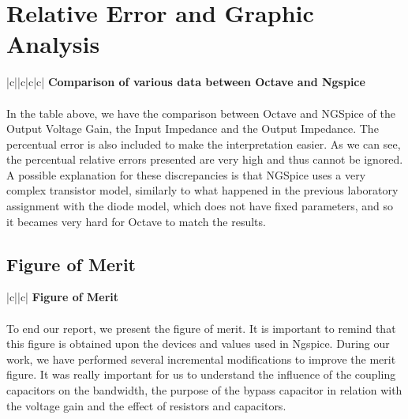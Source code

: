 \section{Relative Error and Graphic Analysis}
\label{sec:erroranalysis}

\begin{center}
   \begin{tabular}{|c||c|c|c|}
      \hline    
       {\bf Comparison of various data between Octave and Ngspice} \\
      \hline
        
   \end{tabular}
\end{center}

\paragraph{}
In the table above, we have the comparison between Octave and NGSpice of the Output Voltage Gain, the Input Impedance and the Output Impedance. The percentual error is also included to make the interpretation easier. As we can see, the percentual relative errors presented are very high and thus cannot be ignored. A possible explanation for these discrepancies is that NGSpice uses a very complex transistor model, similarly to what happened in the previous laboratory assignment with the diode model, which does not have fixed parameters, and so it becames very hard for Octave to match the results.

\subsection{Figure of Merit}
\label{subsec:Figure_of_Merit}

\begin{center}
   \begin{tabular}{|c||c|}
      \hline    
       {\bf Figure of Merit} \\
      \hline
        
   \end{tabular}
 \end{center}

\paragraph{}
To end our report, we present the figure of merit. It is important to remind that this figure is obtained upon the devices and values used in Ngspice. During our work, we have performed several incremental modifications to improve the merit figure. It was really important for us to understand the influence of the coupling capacitors on the bandwidth, the purpose of the bypass capacitor in relation with the voltage gain and the effect of resistors and capacitors. 

